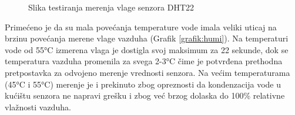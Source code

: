 \documentclass[a4paper, 12pt]{article}
\begin{document}
\vspace{10pt}

\begin{figure}[H]
\centering
{}
\caption{Slika testiranja merenja vlage senzora DHT22} \label{fig:testHumi}
\end{figure}

\pagebreak

\sloppypar
Primećeno je da su mala povećanja temperature vode imala veliki uticaj na brzinu povećanja merene vlage vazduha (Grafik \ref{grafik:humi}). Na temperaturi vode od 55°C izmerena vlaga je dostigla svoj maksimum za 22 sekunde, dok se temperatura vazduha promenila za svega 2-3°C čime je potvrđena prethodna pretpostavka za odvojeno merenje vrednosti senzora. Na većim temperaturama (45°C i 55°C) merenje je i prekinuto zbog opreznosti da kondenzacija vode u kućištu senzora ne napravi grešku i zbog već brzog dolaska do 100\% relativne vlažnosti vazduha.

\vspace{10pt}


\vspace{10pt}

\begin{grafik}	
\begin{center}
\end{center}	
\caption{Testiranja merenja vlage senzora DHT22} \label{grafik:humi}
\end{grafik}
\end{document}
